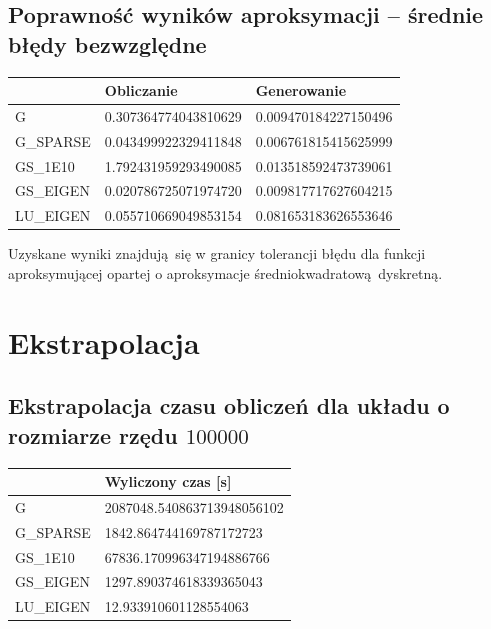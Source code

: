 \documentclass[10pt]{article}
\newenvironment{corollary}[2][Wniosek]{\begin{trivlist}
\item[\hskip \labelsep {\bfseries #1}\hskip \labelsep {\bfseries #2.}]}{\end{trivlist}}
\begin{document}
\subsection{Poprawność wyników aproksymacji – średnie błędy bezwzględne}
\begin{center}
		\begin{tabular}{|C{2.5cm}| C{5cm}|C{5cm}|}
			\hline
			\textbf{} & \textbf{Obliczanie} & \textbf{Generowanie} \\ \hline
			{G} & 0.307364774043810629 & 0.009470184227150496  \\ \hline
			{G\_SPARSE} & 0.043499922329411848 & 0.006761815415625999 \\  \hline
			{GS\_1E10} & 1.792431959293490085 & 0.013518592473739061 \\  \hline
			{GS\_EIGEN} & 0.020786725071974720 & 0.009817717627604215\\ \hline
			{LU\_EIGEN} & 0.055710669049853154 & 0.081653183626553646\\ \hline
		\end{tabular}
\end{center}
\begin{corollary}{1}
	Uzyskane wyniki znajdują się w granicy tolerancji błędu dla funkcji aproksymującej opartej o aproksymacje średniokwadratową dyskretną.

\end{corollary}

\section{Ekstrapolacja}
\subsection{Ekstrapolacja czasu obliczeń dla układu o rozmiarze rzędu $100 000$}
\begin{center}
	\begin{tabular}{|C{2.5cm}|C{5cm}|}
		\hline
		\textbf{} & \textbf{Wyliczony czas [s]}\\ \hline
		{G} & 2087048.540863713948056102 \\ \hline
		{G\_SPARSE} & 1842.864744169787172723 \\  \hline
		{GS\_1E10} & 67836.170996347194886766 \\  \hline
		{GS\_EIGEN} & 1297.890374618339365043 \\ \hline
		{LU\_EIGEN} & 12.933910601128554063 \\ \hline
	\end{tabular}
\end{center}
	
\end{document}
